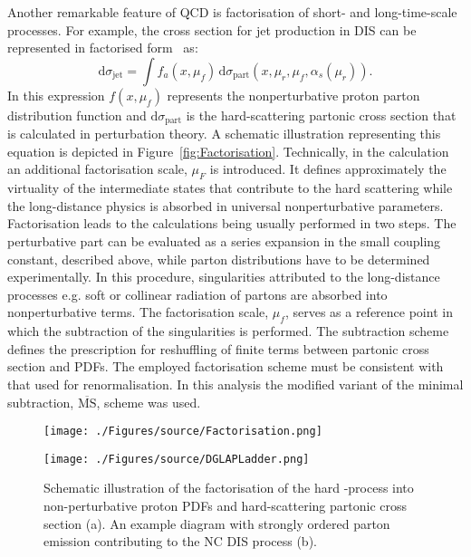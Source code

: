 Another remarkable feature of QCD is factorisation of short- and long-time-scale processes. For example, the cross section for jet production in DIS can be represented in factorised form~\cite{Collins:1989gx} as:
\begin{equation}
 \mathrm{d}\sigma_{\mathrm{jet}} = \int{f_a\left(x,\mu_f\right)}\, \mathrm{d}\sigma_{\mathrm{part}}\left(x,\mu_r, \mu_f, \alpha_s\left(\mu_r\right) \right).
\label{eq:disfactorisation}
\end{equation} 
In this expression $f\left(x,\mu_f\right)$ represents the nonperturbative proton parton distribution function and $\mathrm{d}\sigma_{\mathrm{part}}$ is the hard-scattering partonic cross section that is calculated in perturbation theory. A schematic illustration representing this equation is depicted in Figure~\ref{fig:Factorisation}. Technically, in the calculation an additional factorisation scale, $\mu_F$ is introduced. It defines approximately the virtuality of the intermediate states that contribute to the hard scattering while the long-distance physics is absorbed in universal nonperturbative parameters. Factorisation leads to the calculations being usually performed in two steps. The perturbative part can be evaluated as a series expansion in the small coupling constant, described above, while parton distributions have to be determined experimentally. In this procedure, singularities attributed to the long-distance processes e.g. soft or collinear radiation of partons are absorbed into nonperturbative terms. The factorisation scale, $\mu_f$, serves as a reference point in which the subtraction of the singularities is performed. The subtraction scheme defines the prescription for reshuffling of finite terms between partonic cross section and PDFs. The employed factorisation scheme must be consistent with that used for renormalisation. In this analysis the modified variant of the minimal subtraction, $\overline{\mathrm{MS}}$, scheme was used.
\begin{figure}[t]
	\centering
	\begin{subfloat}[]{
		\texttt{[image: ./Figures/source/Factorisation.png]}
		\label{fig:Factorisation}
	 }%
	\end{subfloat}
	\begin{subfloat}[]{
		\texttt{[image: ./Figures/source/DGLAPLadder.png]}
		\label{fig:DGLAPLadder}
	}%
	\end{subfloat}
	\caption{Schematic illustration of the factorisation of the hard \ep-process into non-perturbative proton PDFs and hard-scattering partonic cross section (a). An example diagram with strongly ordered parton emission contributing to the NC DIS process (b).}
	\label{fig:factorisationdglapladder}
\end{figure}
